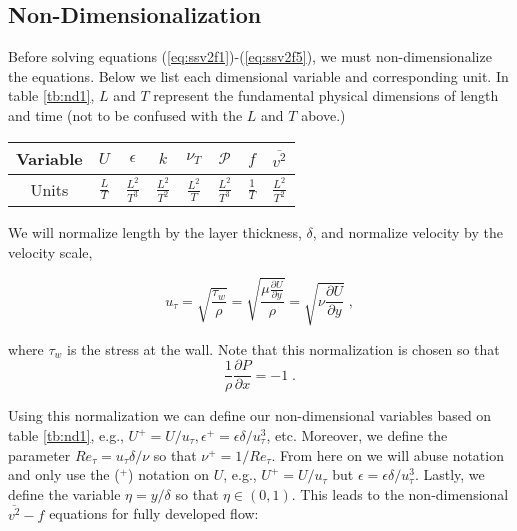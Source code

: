 \documentclass[12pt]{article}
\newcommand{\ep}{\epsilon} \newcommand{\noi}{\noindent}
\newcommand{\pr}{\partial}
\begin{document}
\subsection{Non-Dimensionalization} 

Before solving equations (\ref{eq:ssv2f1})-(\ref{eq:ssv2f5}), we must
non-dimensionalize the equations. Below we list each dimensional variable and
corresponding unit. In table \ref{tb:nd1}, $L$ and $T$ represent the fundamental physical
dimensions of length and time (not to be confused with the $L$ and $T$ above.) 

\begin{center}
\begin{tabular}{|c||c|c|c|c|c|c|c|}
\hline
Variable & $U$ & $\ep$ & $k$ & $\nu_T$ & $\mathcal{P}$ & $f$ & $\overline{v^2}$ \\ 
\hline
Units & $\frac{L}{T}$ & $\frac{L^2}{T^3}$ & $\frac{L^2}{T^2}$ & $\frac{L^2}{T}$ &
$\frac{L^2}{T^3}$ & $\frac{1}{T}$ & $\frac{L^2}{T^2}$\\ 
\hline
\end{tabular}
	\label{tb:nd1}
\end{center}

We will normalize length by the layer thickness, $\delta$, and normalize velocity by
the velocity scale, 

\[ u_\tau = \sqrt{ \frac{\tau_w}{\rho} } = \sqrt{\frac{\mu \frac{\pr U}{\pr
y}}{\rho}} = \sqrt{\nu \frac{\pr U }{\pr y}} \; , \]

\noi where $\tau_w$ is the stress at the wall. Note that this normalization is
chosen so that 
\[ \frac{1}{\rho} \frac{\pr P}{\pr x} = -1 \; . \]

\noi Using this normalization we can define our non-dimensional variables based 
on table \ref{tb:nd1}, e.g., $U^+ = U/u_\tau, \ep^+ = \ep\delta/u_\tau^3$, etc. Moreover, we define the parameter
$Re_\tau = u_\tau \delta / \nu$ so that $\nu^+ = 1/Re_\tau$.  From here on we will abuse
notation and only use the ($^+$) notation on $U$, e.g., $U^+ = U/u_\tau$ but $\ep
= \ep \delta/u_\tau^3$.  Lastly, we  define the variable $\eta = y/\delta$ so that
$\eta \in (0,1)$. This leads to the non-dimensional $\overline{v^2}-f$
equations for fully developed flow: 
\end{document}

